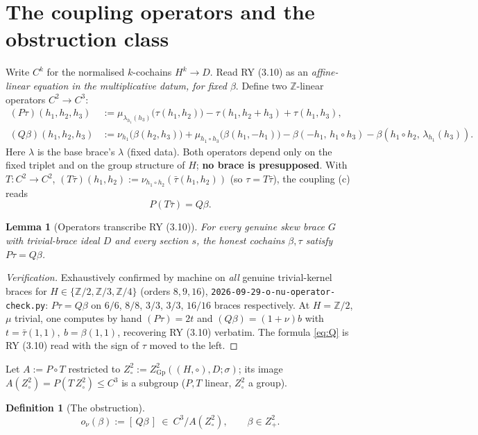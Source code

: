 \documentclass[11pt]{article}
\newtheorem{lemma}[theorem]{Lemma}
\theoremstyle{definition}
\newtheorem{definition}[theorem]{Definition}
\newcommand{\Gp}{\mathrm{Gp}}
\newcommand{\Z}{\mathbb{Z}}
\begin{document}
\section{The coupling operators and the obstruction class}\label{sec:ops}

Write $C^k$ for the normalised $k$-cochains $H^k\to D$. Read RY (3.10) as an
\emph{affine-linear equation in the multiplicative datum, for fixed $\beta$}. Define two
$\Z$-linear operators $C^2\to C^3$:
\begin{align}
(P\tau)(h_1,h_2,h_3)&:=\mu_{\lambda_{h_1}(h_3)}\!\big(\tau(h_1,h_2)\big)
-\tau(h_1,h_2{+}h_3)+\tau(h_1,h_3),\label{eq:P}\\[2pt]
(Q\beta)(h_1,h_2,h_3)&:=\nu_{h_1}\!\big(\beta(h_2,h_3)\big)
+\mu_{h_1\circ h_3}\!\big(\beta(h_1,-h_1)\big)
-\beta(-h_1,\,h_1{\circ}h_3)-\beta(h_1{\circ}h_2,\,\lambda_{h_1}(h_3)).\label{eq:Q}
\end{align}
Here $\lambda$ is the base brace's $\lambda$ (fixed data). Both operators depend only on the
fixed triplet and on the group structure of $H$; \textbf{no brace is presupposed}. With
$T:C^2\to C^2$, $(T\bar\tau)(h_1,h_2):=\nu_{h_1\circ h_2}(\bar\tau(h_1,h_2))$ (so $\tau=T\bar\tau$),
the coupling (c) reads
\begin{equation}\label{eq:coupling}
P(T\bar\tau)=Q\beta .
\end{equation}

\begin{lemma}[Operators transcribe RY (3.10)]\label{lem:opok}
For every genuine skew brace $G$ with trivial-brace ideal $D$ and every section $s$, the
honest cochains $\beta,\tau$ satisfy $P\tau=Q\beta$.
\end{lemma}
\begin{proof}[Verification]
Exhaustively confirmed by machine on \emph{all} genuine trivial-kernel braces for
$H\in\{\Z/2,\Z/3,\Z/4\}$ (orders $8,9,16$), \texttt{2026-09-29-o-nu-operator-check.py}:
$P\tau=Q\beta$ on $6/6$, $8/8$, $3/3$, $3/3$, $16/16$ braces respectively. At $H=\Z/2$,
$\mu$ trivial, one computes by hand $(P\tau)=2t$ and $(Q\beta)=(1+\nu)b$ with
$t=\bar\tau(1,1),\ b=\beta(1,1)$, recovering RY (3.10) verbatim. The formula \eqref{eq:Q}
is RY (3.10) read with the sign of $\tau$ moved to the left.
\end{proof}

Let $A:=P\circ T$ restricted to $Z^2_\circ:=Z^2_\Gp((H,\circ),D;\sigma)$; its image
$A(Z^2_\circ)=P(T\,Z^2_\circ)\le C^3$ is a subgroup ($P,T$ linear, $Z^2_\circ$ a group).

\begin{definition}[The obstruction]\label{def:onu}
\[
o_\nu(\beta):=[\,Q\beta\,]\ \in\ C^3\big/A(Z^2_\circ),\qquad \beta\in Z^2_+.
\]
\end{definition}
\end{document}
